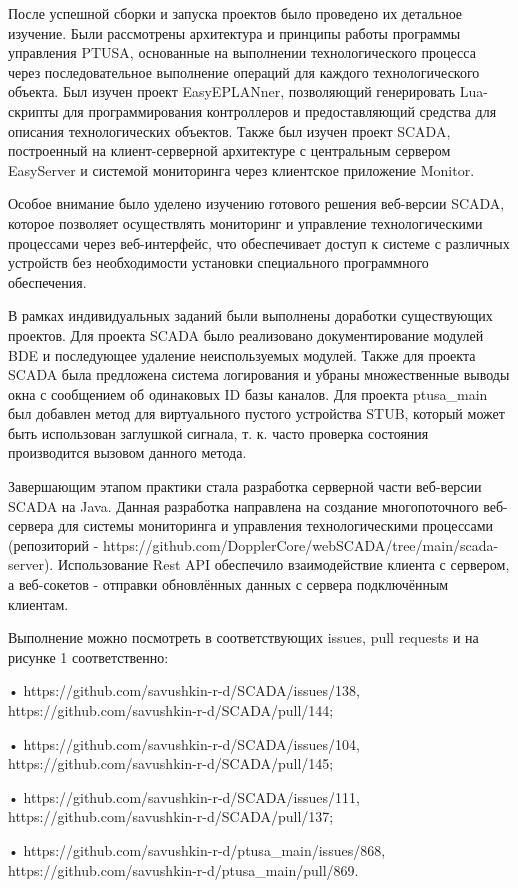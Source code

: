 {\par \redline После успешной сборки и запуска проектов было проведено их детальное изучение. Были рассмотрены архитектура и принципы работы программы управления PTUSA, основанные на выполнении технологического процесса через последовательное выполнение операций для каждого технологического объекта. Был изучен проект EasyEPLANner, позволяющий генерировать Lua-скрипты для программирования контроллеров и предоставляющий средства для описания технологических объектов. Также был изучен проект SCADA, построенный на клиент-серверной архитектуре с центральным сервером EasySer\-ver и системой мониторинга через клиентское приложение Monitor.

\par \redline Особое внимание было уделено изучению готового решения веб-версии SCADA, которое позволяет осуществлять мониторинг и управление технологическими процессами через веб-интерфейс, что обеспечивает доступ к системе с различных устройств без необходимости установки специального программного обеспечения.

\par \redline В рамках индивидуальных заданий были выполнены доработки существующих проектов. Для проекта SCADA было реализовано документирование модулей BDE и последующее удаление неиспользуемых модулей. Также для проекта SCADA была предложена система логирования и убраны множественные выводы окна с сообщением об одинаковых ID базы каналов. Для проекта ptusa\_main был добавлен метод для виртуального пустого устройства STUB, который может быть использован заглушкой сигнала, т. к. часто проверка состояния производится вызовом данного метода.

\par \redline Завершающим этапом практики стала разработка серверной части веб-версии SCA\-DA на Java. Данная разработка направлена на создание многопоточного веб-сервера для системы мониторинга и управления технологическими процессами (репозиторий - https://gi\-thub.com/DopplerCore/webSCADA/tree/main/scada-server). Использование Rest API обеспечило взаимодействие клиента с сервером, а веб-сокетов - отправки обновлённых данных с сервера подключённым клиентам.

\par \redline Выполнение можно посмотреть в соответствующих issues, pull requests и на рисунке 1 соответственно:
  \par \redline • https://github.com/savushkin-r-d/SCADA/issues/138, https://github.com/savushkin-r-d/SCADA/pull/144;
  \par \redline • https://github.com/savushkin-r-d/SCADA/issues/104, https://github.com/savushkin-r-d/SCADA/pull/145;
  \par \redline • https://github.com/savushkin-r-d/SCADA/issues/111, https://github.com/savushkin-r-d/SCADA/pull/137;
  \par \redline • https://github.com/savushkin-r-d/ptusa\_main/issues/868, https://github.com/savushkin-r-d/ptusa\_main/pull/869.

}
